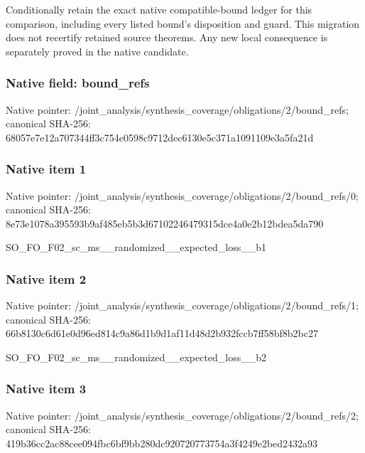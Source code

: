 \documentclass[10pt,a4paper]{article}
\begin{document}
\begingroup\raggedright\sloppy Conditionally retain the exact native compatible-bound ledger for this comparison,\allowbreak{} including every listed bound's disposition and guard. This migration does not recertify retained source theorems. Any new local consequence is separately proved in the native candidate.\par\endgroup

\subsubsection{Native field: bound\_\allowbreak{}refs}
Native pointer: /joint\_\allowbreak{}analysis/synthesis\_\allowbreak{}coverage/obligations/2/bound\_\allowbreak{}refs; canonical SHA-256: 68057e7e12a707344ff3c754e0598c9712dec6130e5c371a1091109e3a5fa21d

\subsubsection{Native item 1}
Native pointer: /joint\_\allowbreak{}analysis/synthesis\_\allowbreak{}coverage/obligations/2/bound\_\allowbreak{}refs/0; canonical SHA-256: 8e73e1078a395593b9af485eb5b3d67102246479315dce4a0e2b12bdea5da790

\begingroup\raggedright\sloppy SO\_\allowbreak{}FO\_\allowbreak{}F02\_\allowbreak{}sc\_\allowbreak{}ms\_\allowbreak{}\_\allowbreak{}randomized\_\allowbreak{}\_\allowbreak{}expected\_\allowbreak{}loss\_\allowbreak{}\_\allowbreak{}b1\par\endgroup

\subsubsection{Native item 2}
Native pointer: /joint\_\allowbreak{}analysis/synthesis\_\allowbreak{}coverage/obligations/2/bound\_\allowbreak{}refs/1; canonical SHA-256: 66b8130c6d61e0d96ed814c9a86d1b9d1af11d48d2b932fccb7ff58bf8b2bc27

\begingroup\raggedright\sloppy SO\_\allowbreak{}FO\_\allowbreak{}F02\_\allowbreak{}sc\_\allowbreak{}ms\_\allowbreak{}\_\allowbreak{}randomized\_\allowbreak{}\_\allowbreak{}expected\_\allowbreak{}loss\_\allowbreak{}\_\allowbreak{}b2\par\endgroup

\subsubsection{Native item 3}
Native pointer: /joint\_\allowbreak{}analysis/synthesis\_\allowbreak{}coverage/obligations/2/bound\_\allowbreak{}refs/2; canonical SHA-256: 419b36cc2ac88cee094fbc6bf9bb280dc920720773754a3f4249e2bed2432a93
\end{document}
